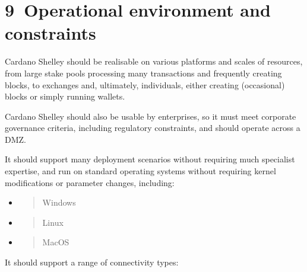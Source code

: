 \documentclass[]{article}
\begin{document}
\hypertarget{operational-environment-and-constraints}{%
\section{​9​~Operational environment and
constraints}\label{operational-environment-and-constraints}}

Cardano Shelley should be realisable on various platforms and scales of
resources, from large stake pools processing many transactions and
frequently creating blocks, to exchanges and, ultimately, individuals,
either creating (occasional) blocks or simply running wallets.

Cardano Shelley should also be usable by enterprises, so it must meet
corporate governance criteria, including regulatory constraints, and
should operate across a DMZ.

It should support many deployment scenarios without requiring much
specialist expertise, and run on standard operating systems without
requiring kernel modifications or parameter changes, including:

\begin{itemize}
\item
  \begin{quote}
  Windows
  \end{quote}
\item
  \begin{quote}
  Linux
  \end{quote}
\item
  \begin{quote}
  MacOS
  \end{quote}
\end{itemize}

It should support a range of connectivity types:
\end{document}
